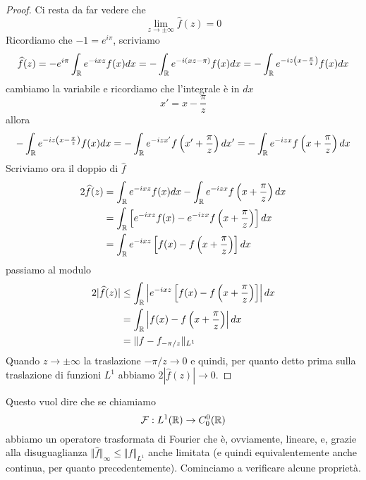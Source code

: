 \begin{proof}
Ci resta da far vedere che
\begin{equation*}
\lim\limits_{z\rightarrow \pm \infty}\hat{f}(z) = 0
\end{equation*}
Ricordiamo che $ - 1 = e^{i\pi}$, scriviamo
\begin{equation*}
\widehat{f}(z) = - e^{i\pi}\int_{\mathbb{R}} e^{- ixz} f(x) dx = - \int_{\mathbb{R}} e^{- i(xz - \pi)} f(x) dx = - \int_{\mathbb{R}} e^{- iz\left(x - \frac{\pi}{z}\right)} f(x) dx
\end{equation*}
cambiamo la variabile e ricordiamo che l'integrale è in $dx$
\begin{equation*}
x' = x - \frac{\pi}{z}
\end{equation*}
allora
\begin{equation*}
- \int_{\mathbb{R}} e^{- iz\left(x - \frac{\pi}{z}\right)} f(x) dx = - \int_{\mathbb{R}} e^{- izx'} f\left(x' + \frac{\pi}{z}\right) dx' = - \int_{\mathbb{R}} e^{- izx} f\left(x + \frac{\pi}{z}\right) dx
\end{equation*}
Scriviamo ora il doppio di $\hat{f}$
\begin{align*}
2\widehat{f}(z) & = \int_{\mathbb{R}} e^{- ixz} f(x) dx - \int_{\mathbb{R}} e^{- izx} f\left(x + \frac{\pi}{z}\right) dx\\
 & = \int_{\mathbb{R}}\left[e^{- ixz} f(x) - e^{- izx} f\left(x + \frac{\pi}{z}\right)\right] dx\\
 & = \int_{\mathbb{R}} e^{- ixz}\left[f(x) - f\left(x + \frac{\pi}{z}\right)\right] dx
\end{align*}
passiamo al modulo
\begin{align*}
2| \widehat{f}(z)| & \leq \int_{\mathbb{R}}\left| e^{- ixz}\left[f(x) - f\left(x + \frac{\pi}{z}\right)\right]\right| dx\\
 & = \int_{\mathbb{R}}\left| f(x) - f\left(x + \frac{\pi}{z}\right)\right| dx\\
 & = \Vert f - f_{- \pi /z} \Vert_{L^{1}}
\end{align*}
Quando $z\rightarrow \pm \infty $ la traslazione $ - \pi /z\rightarrow 0$ e quindi, per quanto detto prima sulla traslazione di funzioni $L^{1}$ abbiamo $2| \hat{f}(z)| \rightarrow 0$.

\end{proof}

Questo vuol dire che se chiamiamo
\begin{equation*}
\mathcal{F} : L^{1}(\mathbb{R})\rightarrow C^{0}_{0}(\mathbb{R})
\end{equation*}
abbiamo un operatore trasformata di Fourier che è, ovviamente, lineare, e, grazie alla disuguaglianza $ \Vert \hat{f} \Vert_{\infty} \leq \Vert f \Vert_{L^{1}}$ anche limitata (e quindi equivalentemente anche continua, per quanto precedentemente). Cominciamo a verificare alcune proprietà.

